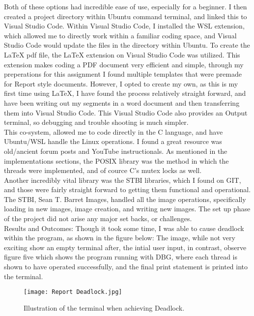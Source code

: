 \documentclass{article}
\begin{document}
Both of these options had incredible ease of use, especially for a beginner. I then created a project directory
within Ubuntu command terminal, and linked this to Visual Studio Code. Within Visual Studio Code, I installed the WSL
extension, which allowed me to directly work within a familiar coding space, and Visual Studio Code would update the
files in the directory within Ubuntu. To create the LaTeX pdf file, the LaTeX extension on Visual Studio Code was utilized.
This extension makes coding a PDF document very efficient and simple, through my preperations for this assignment
I found multiple templates that were premade for Report style documents. However, I opted to create my own, as this
is my first time using LaTeX, I have found the process relatively straight forward, and have been writing out my 
segments in a word document and then transferring them into Visual Studio Code. This Visual Studio Code also provides
an Output terminal, so debugging and trouble shooting is much simpler.\vspace{.5 cm}\\
This co-system, allowed me to code directly in the C language, and have Ubuntu/WSL handle the Linux operations.
I found a great resource was old/ancient forum posts and YouTube instructionals. As mentioned in the implementations sections,
the POSIX library was the method in which the threads were implemented, and of cource C's mutex locks as well.\vspace{.5 cm}\\
Another incredibly vital library was the STBI libraries, which I found on GIT, and those were fairly straight forward
to getting them functional and operational. The STBI, Sean T. Barret Images, handled all the image operations,
specifically loading in new images, image creation, and writing new images.
The set up phase of the project did not arise any major set backs, or challenges.\vspace{.5 cm}\\
Results and Outcomes: Though it took some time, I was able to cause deadlock within the program, as shown in the figure below:
The image, while not very exciting show an empty terminal after, the intial user input, in contrast, observe figure five
which shows the program running with DBG, where each thread is shown to have operated successfully, and the final print statement
is printed into the terminal.\\

\begin{figure}[htbp]
    \centering
    \texttt{[image: Report Deadlock.jpg]}
    \caption{Illustration of the terminal when achieving Deadlock.}
    \label{fig: Deadlock in the Program}
\end{figure}
\end{document}
